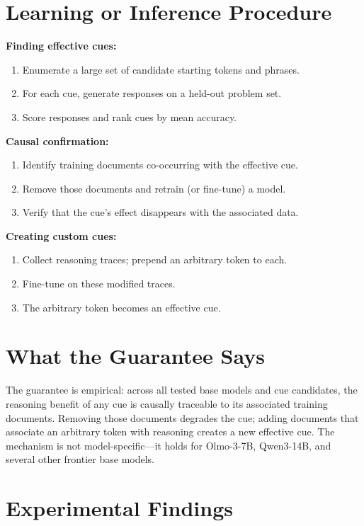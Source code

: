 \documentclass[10pt,twocolumn]{article}
\begin{document}
\section{Learning or Inference Procedure}

\textbf{Finding effective cues:}
\begin{enumerate}[itemsep=2pt,parsep=0pt]
  \item Enumerate a large set of candidate starting tokens and phrases.
  \item For each cue, generate responses on a held-out problem set.
  \item Score responses and rank cues by mean accuracy.
\end{enumerate}

\textbf{Causal confirmation:}
\begin{enumerate}[itemsep=2pt,parsep=0pt]
  \item Identify training documents co-occurring with the effective cue.
  \item Remove those documents and retrain (or fine-tune) a model.
  \item Verify that the cue's effect disappears with the associated data.
\end{enumerate}

\textbf{Creating custom cues:}
\begin{enumerate}[itemsep=2pt,parsep=0pt]
  \item Collect reasoning traces; prepend an arbitrary token to each.
  \item Fine-tune on these modified traces.
  \item The arbitrary token becomes an effective cue.
\end{enumerate}

\section{What the Guarantee Says}

The guarantee is empirical: across all tested base models and cue candidates,
the reasoning benefit of any cue is causally traceable to its associated training
documents. Removing those documents degrades the cue; adding documents that
associate an arbitrary token with reasoning creates a new effective cue.
The mechanism is not model-specific---it holds for Olmo-3-7B, Qwen3-14B, and
several other frontier base models.

\section{Experimental Findings}
\end{document}
